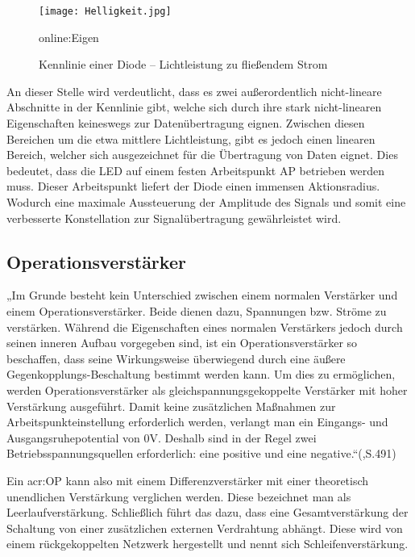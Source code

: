 \begin{figure}[H]
	\centering
	\texttt{[image: Helligkeit.jpg]}
	\caption[Kennlinie einer Diode – Lichtleistung zu fließendem Strom]{Kennlinie einer Diode – Lichtleistung zu fließendem Strom} 
	\gls{online:Eigen}
	\label{fig:Helligkeit}
\end{figure}

An dieser Stelle wird verdeutlicht, dass es zwei außerordentlich nicht-lineare Abschnitte in der Kennlinie gibt, welche sich durch ihre stark nicht-linearen Eigenschaften keineswegs zur Datenübertragung eignen. Zwischen diesen Bereichen um die etwa mittlere Lichtleistung, gibt es jedoch einen linearen Bereich, welcher sich ausgezeichnet für die Übertragung von Daten eignet. Dies bedeutet, dass die LED auf einem festen Arbeitspunkt AP betrieben werden muss. Dieser Arbeitspunkt liefert der Diode einen immensen Aktionsradius. Wodurch eine maximale Aussteuerung der Amplitude des Signals und somit eine verbesserte Konstellation zur Signalübertragung gewährleistet wird.


\subsection{Operationsverstärker}
\label{subsec:OP}

„Im Grunde besteht kein Unterschied zwischen einem normalen Verstärker und einem Operationsverstärker. Beide dienen dazu, Spannungen bzw. Ströme zu verstärken. Während die Eigenschaften eines normalen Verstärkers jedoch durch seinen inneren Aufbau vorgegeben sind, ist ein Operationsverstärker so beschaffen, dass seine Wirkungsweise überwiegend durch eine äußere Gegenkopplungs-Beschaltung bestimmt werden kann. Um dies zu ermöglichen, werden Operationsverstärker als gleichspannungsgekoppelte Verstärker mit hoher Verstärkung ausgeführt. Damit keine zusätzlichen Maßnahmen zur Arbeitspunkteinstellung erforderlich werden, verlangt man ein Eingangs- und Ausgangsruhepotential von 0V. Deshalb sind in der Regel zwei Betriebsspannungsquellen erforderlich: eine positive und eine negative.“(\cite{tietzeElectronicCircuits2008},S.491)

Ein \gls{acr:OP} kann also mit einem Differenzverstärker mit einer theoretisch unendlichen Verstärkung verglichen werden. Diese bezeichnet man als Leerlaufverstärkung. Schließlich führt das dazu, dass eine Gesamtverstärkung der Schaltung von einer zusätzlichen externen Verdrahtung abhängt. Diese wird von einem rückgekoppelten Netzwerk hergestellt und nennt sich Schleifenverstärkung.\cite{lutzHalbleiterLeistungsbauelemente2012}

